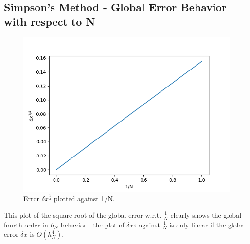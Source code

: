 \documentclass[11pt]{article}
\begin{document}
\newpage

\subsection{Simpson's Method - Global Error Behavior with respect to N}

\begin{figure}[htp]
\centering
\includegraphics[scale=0.80]{simp_err_5000.png}
\caption{Error $\delta x^{\frac{1}{4}}$ plotted against 1/N.}
\label{simp_err}
\end{figure}
This plot of the square root of the global error w.r.t. $\frac{1}{N}$ clearly shows the global fourth order in $h_N$ behavior - the plot of $\delta x^{\frac{1}{4}}$ against $\frac{1}{N}$ is only linear if the global error $\delta x$ is $O(h_N^4)$.
\newpage
\end{document}
